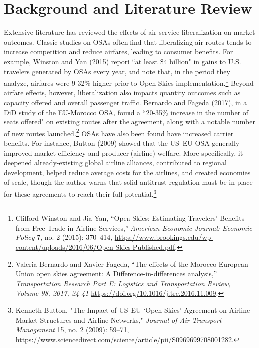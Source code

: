 \documentclass[12pt]{article}
\begin{document}
\section{Background and Literature Review}
Extensive literature has reviewed the effects of air service liberalization on market outcomes. Classic studies on OSAs often find that liberalizing air routes tends to increase competition and reduce airfares, leading to consumer benefits. For example, Winston and Yan (2015) report ``at least \$4 billion" in gains to U.S. travelers generated by OSAs every year, and note that, in the period they analyze, airfares were 9-32\% higher prior to Open Skies implementation.\footnote{Clifford Winston and Jia Yan, “Open Skies: Estimating Travelers’ Benefits from Free Trade in Airline Services,” \textit{American Economic Journal: Economic Policy} 7, no. 2 (2015): 370–414, \url{https://www.brookings.edu/wp-content/uploads/2016/06/Open-Skies-Published.pdf}.} Beyond airfare effects, however, liberalization also impacts quantity outcomes such as capacity offered and overall passenger traffic. Bernardo and Fageda (2017), in a DiD study of the EU-Morocco OSA, found a ``20-35\% increase in the number of seats offered" on existing routes after the agreement, along with a notable number of new routes launched.\footnote{Valeria Bernardo and Xavier Fageda, “The effects of the Morocco-European Union open skies agreement: A Difference-in-differences analysis,” \textit{Transportation Research Part E: Logistics and Transportation Review, Volume 98, 2017, 24-41} \url{https://doi.org/10.1016/j.tre.2016.11.009}.} OSAs have also been found have increased carrier benefits. For instance, Button (2009) showed that the US–EU OSA generally improved market efficiency and producer (airline) welfare. More specifically, it deepened already-existing global airline alliances, contributed to regional development, helped reduce average costs for the airlines, and created economies of scale, though the author warns that solid antitrust regulation must be in place for these agreements to reach their full potential.\footnote{Kenneth Button, "The Impact of US–EU ‘Open Skies’ Agreement on Airline Market Structures and Airline Networks," \textit{Journal of Air Transport Management} 15, no. 2 (2009): 59–71, \url{https://www.sciencedirect.com/science/article/pii/S0969699708001282}.} 
\end{document}
